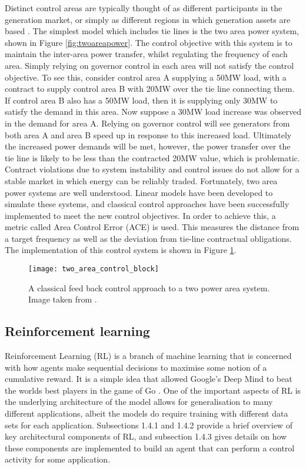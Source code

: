 Distinct control areas are typically thought of as different participants in the generation market, or simply as different regions in which generation assets are based \cite{Kothari2011}. The simplest model which includes tie lines is the two area power system, shown in Figure \ref{fig:twoareapower}. The control objective with this system is to maintain the inter-area power transfer, whilst regulating the frequency of each area. Simply relying on governor control in each area will not satisfy the control objective. To see this, consider control area A supplying a 50MW load, with a contract to supply control area B with 20MW over the tie line connecting them. If control area B also has a 50MW load, then it is supplying only 30MW to satisfy the demand in this area. Now suppose a 30MW load increase was observed in the demand for area A. Relying on governor control will see generators from both area A and area B speed up in response to this increased load. Ultimately the increased power demands will be met, however, the power transfer over the tie line is likely to be less than the contracted 20MW value, which is problematic. Contract violations due to system instability and control issues do not allow for a stable market in which energy can be reliably traded. Fortunately, two area power systems are well understood. Linear models have been developed to simulate these systems, and classical control approaches have been successfully implemented to meet the new control objectives. In order to achieve this, a metric called Area Control Error (ACE) is used. This measures the distance from a target frequency as well as the deviation from tie-line contractual obligations. The implementation of this control system is shown in Figure \ref{fig:twoareacontrolblock}.

\vspace{2cm}

\begin{figure}[ht]
	\centering
	\texttt{[image: two\_area\_control\_block]}
	\caption{A classical feed back control approach to a two power area system. Image taken from \cite{Kothari2011}.}
	\label{fig:twoareacontrolblock}
\end{figure}

\newpage

\subsection{Reinforcement learning}
Reinforcement Learning (RL) is a branch of machine learning that is concerned with how agents make sequential decisions to maximise some notion of a cumulative reward. It is a simple idea that allowed Google's Deep Mind to beat the worlds best players in the game of Go \cite{Silver2016}. One of the important aspects of RL is the underlying architecture of the model allows for generalisation to many different applications, albeit the models do require training with different data sets for each application. Subsections 1.4.1 and 1.4.2 provide a brief overview of key architectural components of RL, and subsection 1.4.3 gives details on how these components are implemented to build an agent that can perform a control activity for some application.

